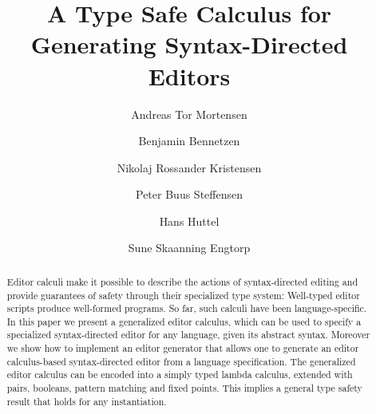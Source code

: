 \documentclass[sigplan]{acmart}
\begin{document}
\title{A Type Safe Calculus for Generating
  Syntax-Directed Editors}



\author{Andreas Tor Mortensen}


\author{Benjamin Bennetzen}


\author{Nikolaj Rossander Kristensen}

\author{Peter Buus Steffensen}
\authornotemark[1]


\author{Hans Huttel}
\author{Sune Skaanning Engtorp}
\authornotemark[2]



\renewcommand{\shortauthors}{Bennetzen et al.}

\begin{abstract}

  Editor calculi make it possible to describe the actions of
  syntax-directed editing and provide guarantees of safety through
  their specialized type system: Well-typed editor scripts produce
  well-formed programs. So far, such calculi have been
  language-specific. In this paper we present a generalized editor
  calculus, which can be used to specify a specialized syntax-directed
  editor for any language, given its abstract syntax. Moreover we show
  how to implement an editor generator that allows one to generate an
  editor calculus-based syntax-directed editor from a language
  specification. The generalized editor calculus can be encoded into a
  simply typed lambda calculus, extended with pairs, booleans, pattern
  matching and fixed points. This implies a general type safety result
  that holds for any instantiation.
\end{abstract}
\end{document}

